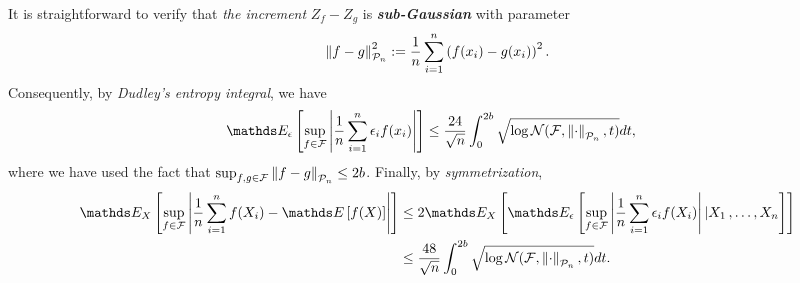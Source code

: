 \documentclass[11pt]{article}
\begin{document}
\begin{itemize}
\begin{remark}
It is straightforward to verify that \emph{the increment} $Z_f - Z_g$ is \emph{\textbf{sub-Gaussian}} with parameter
\begin{align*}
\left\|f - g\right\|_{{\mathcal P}_n}^2 := \frac{1}{n}\sum_{i=1}^n\left(f(x_i) - g(x_i)\right)^2.
\end{align*}
Consequently, by \emph{Dudley's entropy integral}, we have
\begin{align}
\E{\epsilon}{\sup_{f\in \cF}\abs{\frac{1}{n}\sum_{i=1}^n \epsilon_i f(x_i) }} &\le \frac{24}{\sqrt{n}}\int_{0}^{2b}\sqrt{\log \cN(\cF, \norm{\cdot}{\cP_n}, t)} dt, \label{ineqn: dudley_metric_entropy_Rademacher_process}
\end{align}
where we have used the fact that $\sup_{f, g \in {\mathcal F}}\left\|f - g\right\|_{{\mathcal P}_n} \le 2b$. Finally, by \emph{symmetrization}, 
\begin{align*}
\E{X}{\sup_{f \in \cF}\abs{\frac{1}{n}\sum_{i=1}^{n}f(X_i) - \E{}{f(X)}}} &\le 2 \E{X}{\E{\epsilon}{\sup_{f\in \cF}\abs{\frac{1}{n}\sum_{i=1}^n \epsilon_i f(X_i) }| X_1 \xdotx{,} X_n}}\\
&\le \frac{48}{\sqrt{n}}\int_{0}^{2b}\sqrt{\log \cN(\cF, \norm{\cdot}{\cP_n}, t)} dt.
\end{align*}
\end{remark}
\end{itemize}
\end{document}
